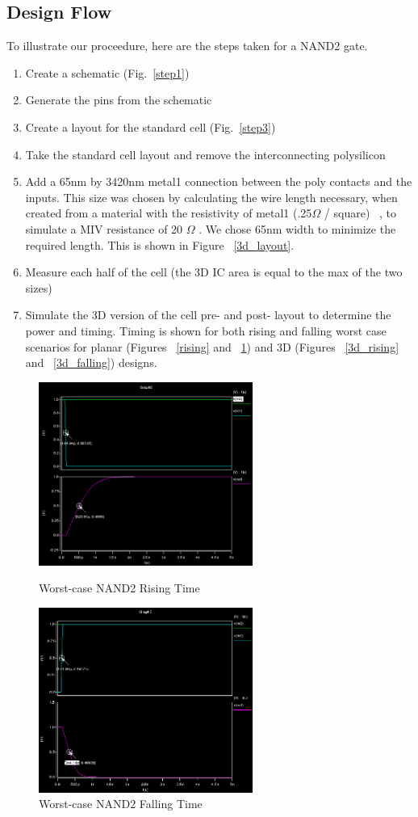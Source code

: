 \documentclass{article}
\begin{document}
\subsection{Design Flow} To illustrate our proceedure, here are the steps taken for a NAND2 gate. 
	\begin{enumerate}
		\item Create a schematic (Fig.~\ref{step1})
		\item Generate the pins from the schematic
		\item Create a layout for the standard cell (Fig.~\ref{step3})
		\item Take the standard cell layout and remove the interconnecting polysilicon
		\item Add a 65nm by 3420nm metal1 connection between the poly contacts and the inputs. This size was chosen by calculating the wire length necessary, when created from a material with the resistivity of metal1 (.25$\Omega$ / square) ~\cite{NCSU}, to simulate a MIV resistance of 20 $\Omega$ \cite{ULTRA} . We chose 65nm width to minimize the required length.  This is shown in Figure ~\ref{3d_layout}.
		\item Measure each half of the cell (the 3D IC area is equal to the max of the two sizes)
		\item Simulate the 3D version of the cell pre- and post- layout to determine the power and timing. Timing is shown for both rising and falling worst case scenarios for planar (Figures ~\ref{rising} and ~\ref{falling}) and 3D (Figures ~\ref{3d_rising} and ~\ref{3d_falling}) designs.
	\end{enumerate}
\begin{figure}
\centering
\parbox{8cm}{
\includegraphics[width=7cm]{rising}
  \caption{Worst-case NAND2 Rising Time}
\label{rising}}
\qquad
\begin{minipage}{7cm}
\includegraphics[width=7cm]{falling}
  \caption{Worst-case NAND2 Falling Time}
\label{falling}
\end{minipage}
\end{figure}
\end{document}
